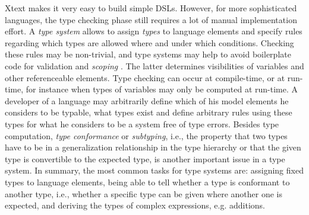 Xtext makes it very easy to build simple DSLs. However, for more sophisticated
languages, the type checking phase still requires a lot of manual implementation
effort. A \emph{type system} allows to assign \emph{types} to language elements
and specify rules regarding which types are allowed where and under which
conditions. Checking these rules may be non-trivial, and type systems may help
to avoid boilerplate code for validation and \emph{scoping} .
The latter determines visibilities of variables and other referenceable
elements.  Type checking can
occur at compile-time, or at run-time, for instance when types of variables may
only be computed at run-time.  A developer of a language may
arbitrarily define which of his model elements he considers to be typable, what
types exist and define arbitrary rules using these types for what he considers
to be a system free of type errors.
Besides type computation, \emph{type conformance} or \emph{subtyping}, i.e., the
property that two types have to be in a generalization relationship in the type
hierarchy or that the given type is convertible to the expected type, is another
important issue in a type system.
In summary, the most common tasks for type systems are:
assigning fixed types to language elements, being able to tell whether a type is
conformant to another type, i.e., whether a specific type can be given where
another one is expected, and deriving the types of complex expressions, e.g.
additions.


